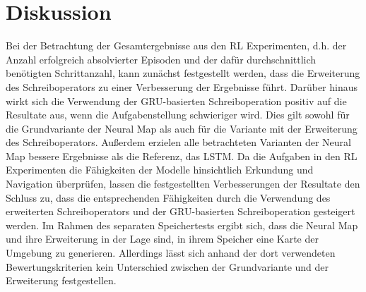 \chapter{Diskussion}
\label{chap_disc}


Bei der Betrachtung der Gesamtergebnisse aus den RL Experimenten, d.h. der Anzahl erfolgreich absolvierter Episoden und der dafür durchschnittlich benötigten Schrittanzahl, kann zunächst festgestellt werden, dass die Erweiterung des Schreiboperators zu einer Verbesserung der Ergebnisse führt. Darüber hinaus wirkt sich die Verwendung der GRU-basierten Schreiboperation positiv auf die Resultate aus, wenn die Aufgabenstellung schwieriger wird. Dies gilt sowohl für die Grundvariante der Neural Map als auch für die Variante mit der Erweiterung des Schreiboperators. Außerdem erzielen alle betrachteten Varianten der Neural Map bessere Ergebnisse als die Referenz, das LSTM. Da die Aufgaben in den RL Experimenten die Fähigkeiten der Modelle hinsichtlich Erkundung und Navigation überprüfen, lassen die festgestellten Verbesserungen der Resultate den Schluss zu, dass die entsprechenden Fähigkeiten durch die Verwendung des erweiterten Schreiboperators und der GRU-basierten Schreiboperation gesteigert werden. Im Rahmen des separaten Speichertests ergibt sich, dass die Neural Map und ihre Erweiterung in der Lage sind, in ihrem Speicher eine Karte der Umgebung zu generieren. Allerdings lässt sich anhand der dort verwendeten Bewertungskriterien kein Unterschied zwischen der Grundvariante und der Erweiterung festgestellen.

